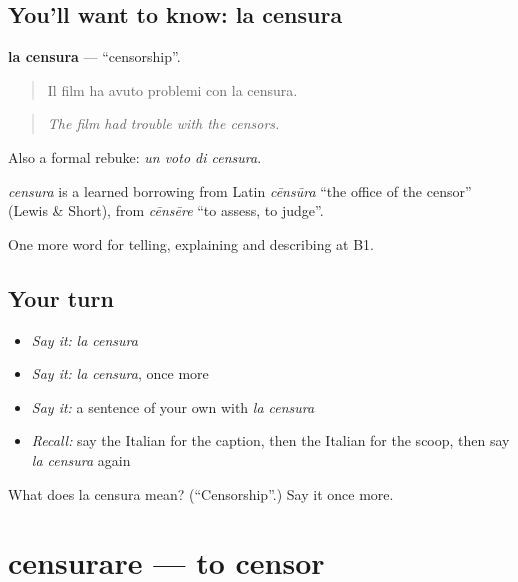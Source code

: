\subsection*{You'll want to know: la censura}
\textbf{la censura} — \textquotedblleft{}censorship\textquotedblright{}.

\begin{quote}
Il film ha avuto problemi con la censura.
\end{quote}

\begin{quote}
\emph{The film had trouble with the censors.}
\end{quote}

Also a formal rebuke: \emph{un voto di censura}.

\begin{cousinweb}
\emph{censura} is a learned borrowing from Latin \emph{cēnsūra} \textquotedblleft{}the office of the censor\textquotedblright{} (Lewis \& Short), from \emph{cēnsēre} \textquotedblleft{}to assess, to judge\textquotedblright{}.
\end{cousinweb}

\begin{grammarlens}[title={What you've built}]
One more word for telling, explaining and describing at B1.
\end{grammarlens}

\subsection*{Your turn}
\begin{itemize}
\raggedright
  \item \emph{Say it:} \emph{la censura}
  \item \emph{Say it:} \emph{la censura}, once more
  \item \emph{Say it:} a sentence of your own with \emph{la censura}
  \item \emph{Recall:} say the Italian for the caption, then the Italian for the scoop, then say \emph{la censura} again
\end{itemize}

\begin{tcolorbox}[breakable,colback=teal!4,colframe=teal!35!black,title={Before you move on}]
What does la censura mean? (\textquotedblleft{}Censorship\textquotedblright{}.) Say it once more.
\end{tcolorbox}
\section[censurare]{censurare — to censor}

